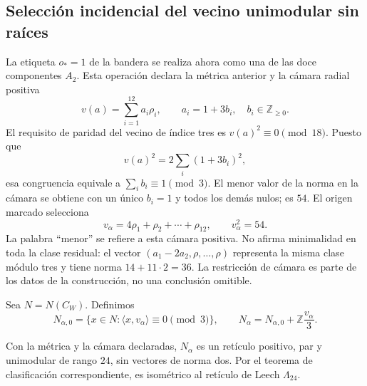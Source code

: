 \subsection{Selección incidencial del vecino unimodular sin raíces}
\label{exc:leech}



La etiqueta $o_*=1$ de la bandera se realiza ahora como una de las
doce componentes $A_2$. Esta operación declara la métrica anterior y
la cámara radial positiva
\[
 v(a)=\sum_{i=1}^{12}a_i\rho_i,
 \qquad a_i=1+3b_i,\quad b_i\in\mathbb Z_{\geq0}.
\]
El requisito de paridad del vecino de índice tres es
$v(a)^2\equiv0\pmod{18}$. Puesto que
\[
 v(a)^2=2\sum_i(1+3b_i)^2,
\]
esa congruencia equivale a $\sum_i b_i\equiv1\pmod3$. El menor
valor de la norma en la cámara se obtiene con un único $b_i=1$ y
todos los demás nulos; es $54$. El origen marcado selecciona
\begin{equation}
 v_\alpha=4\rho_1+\rho_2+\cdots+\rho_{12},
 \qquad v_\alpha^2=54.
 \label{exc:vector}
\end{equation}
La palabra ``menor'' se refiere a esta cámara positiva. No afirma
minimalidad en toda la clase residual: el vector
$(a_1-2a_2,\rho,\ldots,\rho)$ representa la misma clase módulo tres
y tiene norma $14+11\cdot2=36$. La restricción de cámara es parte
de los datos de la construcción, no una conclusión omitible.

Sea $N=N(C_W)$. Definimos
\begin{equation}
 N_{\alpha,0}=\{x\in N:\langle x,v_\alpha\rangle\equiv0\pmod3\},
 \qquad
 N_\alpha=N_{\alpha,0}+\mathbb Z\frac{v_\alpha}{3}.
 \label{exc:vecino}
\end{equation}

\begin{theorem}
\label{exc:teorema-leech}
Con la métrica y la cámara declaradas, $N_\alpha$ es un retículo
positivo, par y unimodular de rango $24$, sin vectores de norma dos.
Por el teorema de clasificación correspondiente, es isométrico al
retículo de Leech $\Lambda_{24}$.
\end{theorem}

